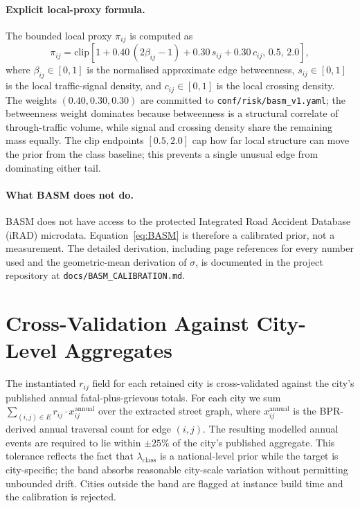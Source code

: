 \paragraph{Explicit local-proxy formula.}
The bounded local proxy $\pi_{ij}$ is computed as
\begin{equation}
    \pi_{ij} = \mathrm{clip}\!\left[
        1 + 0.40\,(2\beta_{ij} - 1) + 0.30\,s_{ij} + 0.30\,c_{ij},
        \,0.5,\, 2.0\right],
    \label{eq:pi-proxy}
\end{equation}
where $\beta_{ij} \in [0,1]$ is the normalised approximate edge
betweenness, $s_{ij} \in [0,1]$ is the local traffic-signal density,
and $c_{ij} \in [0,1]$ is the local crossing density. The weights
$(0.40, 0.30, 0.30)$ are committed to
\texttt{conf/risk/basm\_v1.yaml}; the betweenness weight dominates
because betweenness is a structural correlate of through-traffic
volume, while signal and crossing density share the remaining mass
equally. The clip endpoints $[0.5, 2.0]$ cap how far local structure
can move the prior from the class baseline; this prevents a single
unusual edge from dominating either tail.

\paragraph{What BASM does not do.}
BASM does not have access to the protected Integrated Road Accident
Database (iRAD) microdata. Equation~\eqref{eq:BASM} is therefore a
calibrated prior, not a measurement. The detailed derivation,
including page references for every \citet{morth2022} number used
and the geometric-mean derivation of $\sigma$, is documented in the
project repository at \texttt{docs/BASM\_CALIBRATION.md}.

\section{Cross-Validation Against City-Level Aggregates}
\label{ch4:xv}

The instantiated $r_{ij}$ field for each retained city is
cross-validated against the city's published annual fatal-plus-grievous
totals. For each city we sum
$\sum_{(i,j) \in E} r_{ij} \cdot x_{ij}^{\text{annual}}$ over the
extracted street graph, where $x_{ij}^{\text{annual}}$ is the
BPR-derived annual traversal count for edge $(i,j)$. The resulting
modelled annual events are required to lie within $\pm 25\%$ of the
city's published aggregate. This tolerance reflects the fact that
$\lambda_{\mathrm{class}}$ is a national-level prior while the target
is city-specific; the band absorbs reasonable city-scale variation
without permitting unbounded drift. Cities outside the band are
flagged at instance build time and the calibration is rejected.

